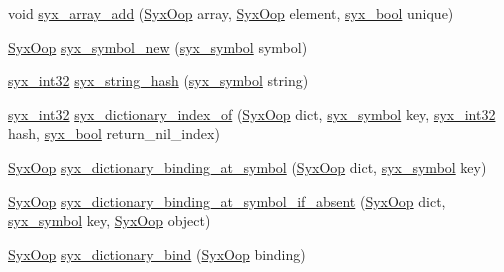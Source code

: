 \begin{CompactItemize}
\item 
void \hyperlink{syx-object_8c_45d10f545165a46c4c22fa8a59927e6b}{syx\_\-array\_\-add} (\hyperlink{syx-types_8h_1121caba2d40b2ce090b640762744ccd}{SyxOop} array, \hyperlink{syx-types_8h_1121caba2d40b2ce090b640762744ccd}{SyxOop} element, \hyperlink{syx-types_8h_c6dc09b276b99fa1956364359139daab}{syx\_\-bool} unique)
\item 
\hyperlink{syx-types_8h_1121caba2d40b2ce090b640762744ccd}{SyxOop} \hyperlink{syx-object_8c_6ef910113cd4a2eea7885781a54a2bc7}{syx\_\-symbol\_\-new} (\hyperlink{syx-types_8h_9663af54b7b72f5d8be5f754ef356525}{syx\_\-symbol} symbol)
\item 
\hyperlink{syx-types_8h_9f31c17555a2dfcf25da84b5c4a2e55b}{syx\_\-int32} \hyperlink{syx-object_8c_5d8630a6cd69dfcb6bb5b50b159a729b}{syx\_\-string\_\-hash} (\hyperlink{syx-types_8h_9663af54b7b72f5d8be5f754ef356525}{syx\_\-symbol} string)
\item 
\hyperlink{syx-types_8h_9f31c17555a2dfcf25da84b5c4a2e55b}{syx\_\-int32} \hyperlink{syx-object_8c_731782a713f0ca043fd3c589bdce9c75}{syx\_\-dictionary\_\-index\_\-of} (\hyperlink{syx-types_8h_1121caba2d40b2ce090b640762744ccd}{SyxOop} dict, \hyperlink{syx-types_8h_9663af54b7b72f5d8be5f754ef356525}{syx\_\-symbol} key, \hyperlink{syx-types_8h_9f31c17555a2dfcf25da84b5c4a2e55b}{syx\_\-int32} hash, \hyperlink{syx-types_8h_c6dc09b276b99fa1956364359139daab}{syx\_\-bool} return\_\-nil\_\-index)
\item 
\hyperlink{syx-types_8h_1121caba2d40b2ce090b640762744ccd}{SyxOop} \hyperlink{syx-object_8c_b1fb0a51e91c9dfe8fed1b8258974ad8}{syx\_\-dictionary\_\-binding\_\-at\_\-symbol} (\hyperlink{syx-types_8h_1121caba2d40b2ce090b640762744ccd}{SyxOop} dict, \hyperlink{syx-types_8h_9663af54b7b72f5d8be5f754ef356525}{syx\_\-symbol} key)
\item 
\hyperlink{syx-types_8h_1121caba2d40b2ce090b640762744ccd}{SyxOop} \hyperlink{syx-object_8c_778fcf3802402d6a173931cbd3e8ef42}{syx\_\-dictionary\_\-binding\_\-at\_\-symbol\_\-if\_\-absent} (\hyperlink{syx-types_8h_1121caba2d40b2ce090b640762744ccd}{SyxOop} dict, \hyperlink{syx-types_8h_9663af54b7b72f5d8be5f754ef356525}{syx\_\-symbol} key, \hyperlink{syx-types_8h_1121caba2d40b2ce090b640762744ccd}{SyxOop} object)
\item 
\hyperlink{syx-types_8h_1121caba2d40b2ce090b640762744ccd}{SyxOop} \hyperlink{syx-object_8c_a81f27a1ea91fc341ccee4224b4fef1c}{syx\_\-dictionary\_\-bind} (\hyperlink{syx-types_8h_1121caba2d40b2ce090b640762744ccd}{SyxOop} binding)
\item 

\end{CompactItemize}
